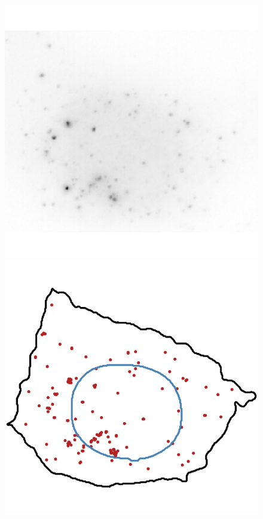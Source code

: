 \begin{figure}[]
	\centering
		\includegraphics[width=0.95\linewidth]{figures/introduction/real_image_foci}
		\vfill
		\includegraphics[width=0.95\linewidth]{figures/introduction/real_coord_foci}
	\endminipage\hfill

\end{figure}
